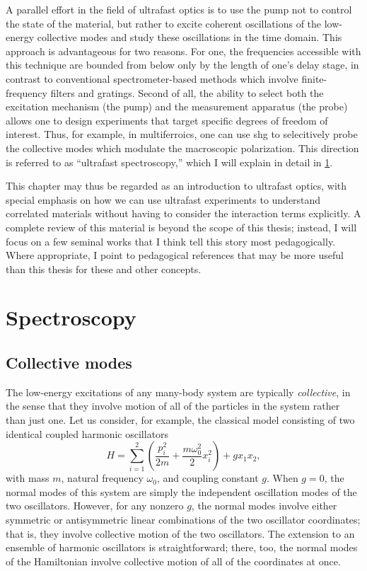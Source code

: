 A parallel effort in the field of ultrafast optics is to use the pump not to control the state of the material, but rather to excite coherent oscillations of the low-energy collective modes and study these oscillations in the time domain.
This approach is advantageous for two reasons.
For one, the frequencies accessible with this technique are bounded from below only by the length of one's delay stage, in contrast to conventional spectrometer-based methods which involve finite-frequency filters and gratings.
Second of all, the ability to select both the excitation mechanism (the pump) and the measurement apparatus (the probe) allows one to design experiments that target specific degrees of freedom of interest.
Thus, for example, in multiferroics, one can use \gls{shg} to selecitively probe the collective modes which modulate the macroscopic polarization.
This direction is referred to as ``ultrafast spectroscopy,'' which I will explain in detail in \cref{sec:ultrafastspectroscopy}.

This chapter may thus be regarded as an introduction to ultrafast optics, with special emphasis on how we can use ultrafast experiments to understand correlated materials without having to consider the interaction terms explicitly.
A complete review of this material is beyond the scope of this thesis; instead, I will focus on a few seminal works that I think tell this story most pedagogically.
Where appropriate, I point to pedagogical references that may be more useful than this thesis for these and other concepts.

\section{Spectroscopy}\label{sec:ultrafastspectroscopy}

\subsection{Collective modes}

The low-energy excitations of any many-body system are typically \emph{collective}, in the sense that they involve motion of all of the particles in the system rather than just one.
Let us consider, for example, the classical model consisting of two identical coupled harmonic oscillators
\begin{equation}
H = \sum_{i=1}^2\left(\frac{p_i^2}{2m}+\frac{m\omega_0^2}{2}x_i^2\right)+gx_1x_2,
\end{equation}
with mass $m$, natural frequency $\omega_0$, and coupling constant $g$.
When $g=0$, the normal modes of this system are simply the independent oscillation modes of the two oscillators.
However, for any nonzero $g$, the normal modes involve either symmetric or antisymmetric linear combinations of the two oscillator coordinates; that is, they involve collective motion of the two oscillators.
The extension to an ensemble of harmonic oscillators is straightforward; there, too, the normal modes of the Hamiltonian involve collective motion of all of the coordinates at once.

